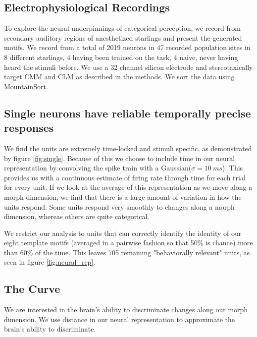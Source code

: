 \subsection{Electrophysiological Recordings}

To explore the neural underpinnings of categorical perception, we record from secondary auditory regions of anesthetized starlings and present the generated motifs. We record from a total of 2019 neurons in 47 recorded population sites in 8 different starlings, 4 having been trained on the task, 4 naive, never having heard the stimuli before. We use a 32 channel silicon electrode and stereotaxically target \ac{CMM} and \ac{CLM} as described in the methods. We sort the data using MountainSort\cite{mountainsort}. 

\subsection{Single neurons have reliable temporally precise responses}



We find the units are extremely time-locked and stimuli specific, as demonstrated by figure \ref{fig:single}. Because of this we choose to include time in our neural representation by convolving the spike train with a Gaussian($\sigma = \SI{10}{ms}$). This provides us with a continuous estimate of firing rate through time for each trial for every unit. If we look at the average of this representation as we move along a morph dimension, we find that there is a large amount of variation in how the units respond. Some units respond very smoothly to changes along a morph dimension, whereas others are quite categorical.



We restrict our analysis to units that can correctly identify the identity of our eight template motifs (averaged in a pairwise fashion so that 50\% is chance) more than 60\% of the time. This leaves 705 remaining "behaviorally relevant" units, as seen in figure \ref{fig:neural_rep}.

\subsection{The \Thielk Curve}



We are interested in the brain's ability to discriminate changes along our morph dimension. We use distance in our neural representation to approximate the brain's ability to discriminate. 


